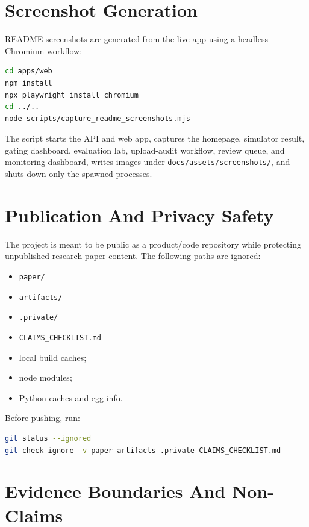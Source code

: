 \documentclass[11pt]{article}
\newcommand{\codepath}[1]{\nolinkurl{#1}}
\begin{document}
\section{Screenshot Generation}

README screenshots are generated from the live app using a headless Chromium workflow:

\begin{lstlisting}[language=bash]
cd apps/web
npm install
npx playwright install chromium
cd ../..
node scripts/capture_readme_screenshots.mjs
\end{lstlisting}

The script starts the API and web app, captures the homepage, simulator result, gating dashboard, evaluation lab, upload-audit workflow, review queue, and monitoring dashboard, writes images under \codepath{docs/assets/screenshots/}, and shuts down only the spawned processes.

\section{Publication And Privacy Safety}

The project is meant to be public as a product/code repository while protecting unpublished research paper content. The following paths are ignored:

\begin{itemize}[leftmargin=*]
  \item \codepath{paper/}
  \item \codepath{artifacts/}
  \item \codepath{.private/}
  \item \codepath{CLAIMS\_CHECKLIST.md}
  \item local build caches;
  \item node modules;
  \item Python caches and egg-info.
\end{itemize}

Before pushing, run:

\begin{lstlisting}[language=bash]
git status --ignored
git check-ignore -v paper artifacts .private CLAIMS_CHECKLIST.md
\end{lstlisting}

\section{Evidence Boundaries And Non-Claims}
\end{document}
